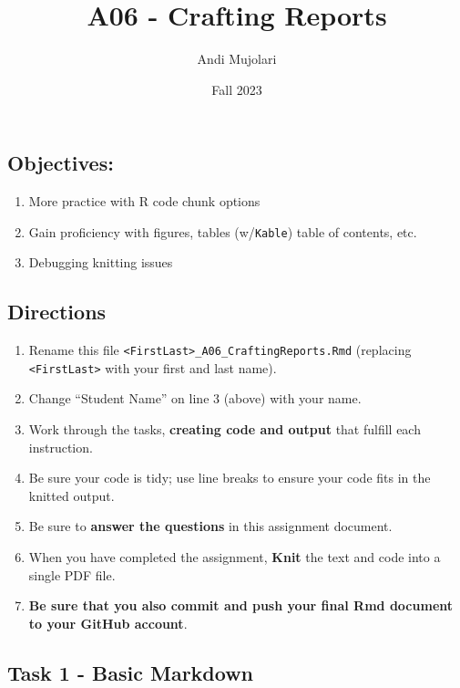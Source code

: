 \documentclass[
]{article}
\title{A06 - Crafting Reports}
\author{Andi Mujolari}
\date{Fall 2023}
\providecommand{\tightlist}{%
  \setlength{\itemsep}{0pt}\setlength{\parskip}{0pt}}
\begin{document}
\maketitle

{
\setcounter{tocdepth}{3}
\tableofcontents
}
\listoftables

\hypertarget{objectives}{%
\subsection{Objectives:}\label{objectives}}

\begin{enumerate}
\def\labelenumi{\arabic{enumi}.}
\tightlist
\item
  More practice with R code chunk options
\item
  Gain proficiency with figures, tables (w/\texttt{Kable}) table of
  contents, etc.
\item
  Debugging knitting issues
\end{enumerate}

\hypertarget{directions}{%
\subsection{Directions}\label{directions}}

\begin{enumerate}
\def\labelenumi{\arabic{enumi}.}
\tightlist
\item
  Rename this file
  \texttt{\textless{}FirstLast\textgreater{}\_A06\_CraftingReports.Rmd}
  (replacing \texttt{\textless{}FirstLast\textgreater{}} with your first
  and last name).
\item
  Change ``Student Name'' on line 3 (above) with your name.
\item
  Work through the tasks, \textbf{creating code and output} that fulfill
  each instruction.
\item
  Be sure your code is tidy; use line breaks to ensure your code fits in
  the knitted output.
\item
  Be sure to \textbf{answer the questions} in this assignment document.
\item
  When you have completed the assignment, \textbf{Knit} the text and
  code into a single PDF file.
\item
  \textbf{Be sure that you also commit and push your final Rmd document
  to your GitHub account}.
\end{enumerate}

\hypertarget{task-1---basic-markdown}{%
\subsection{Task 1 - Basic Markdown}\label{task-1---basic-markdown}}
\end{document}
